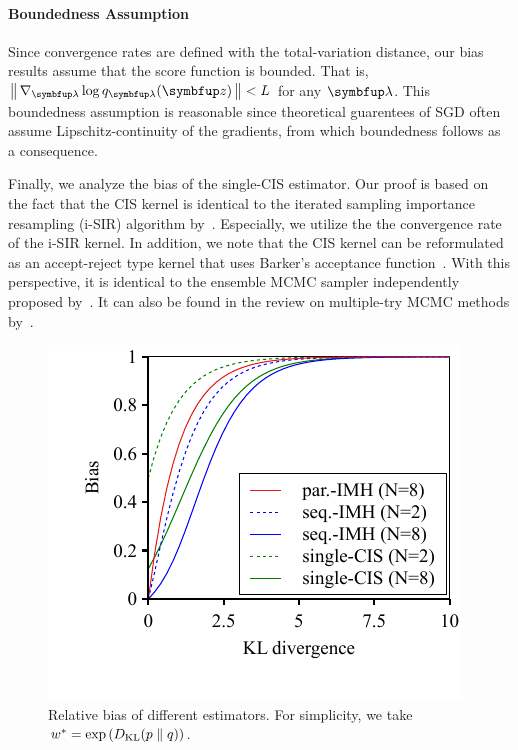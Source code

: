 \vspace{-0.05in}
\paragraph{Boundedness Assumption}
Since convergence rates are defined with the total-variation distance, our bias results assume that the score function is bounded.
That is, \(\norm{\nabla_{\vlambda} \log q_{\vlambda}(\vz)} < L\) for any \(\vlambda\).
This boundedness assumption is reasonable since theoretical guarentees of SGD often assume Lipschitz-continuity of the gradients, from which boundedness follows as a consequence.

%

%

%
Finally, we analyze the bias of the single-CIS estimator.
Our proof is based on the fact that the CIS kernel is identical to the iterated sampling importance resampling (i-SIR) algorithm by~\citet{andrieu_uniform_2018}.
Especially, we utilize the the convergence rate of the i-SIR kernel.
In addition, we note that the CIS kernel can be reformulated as an accept-reject type kernel that uses Barker's acceptance function~\citep{barker_monte_1965}.
With this perspective, it is identical to the ensemble MCMC sampler independently proposed by~\citet{austad_parallel_2007, neal_mcmc_2011a}.
It can also be found in the review on multiple-try MCMC methods by~\citet[Table 12]{martino_review_2018a}.
%

%
\begin{figure}[H]
\vspace{-0.05in}
  \centering
  \includegraphics[scale=0.8]{figures/bias_01.pdf}
  \caption{Relative bias of different estimators.
  For simplicity, we take \(w^* = \exp\left( D_{\mathrm{KL}}(p\parallel q) \right)\).}\label{fig:bias}
\vspace{-0.05in}
\end{figure}
%
\vspace{-0.05in}
